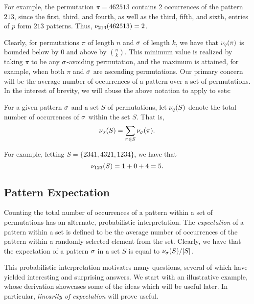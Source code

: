  For example, the permutation $\pi = 462513$ contains $2$ occurrences of the
  pattern $213$, since the first, third, and fourth, as well as the third,
  fifth, and sixth, entries of $p$ form $213$ patterns. Thus,
  $\nu_{213}(462513) = 2$.  

  Clearly, for permutations $\pi$ of length $n$ and $\sigma$ of length $k$, we have
  that $\nu_q(\pi)$ is bounded below by $0$ and above by $\binom{n}{k}$. This
  minimum value is realized by taking $\pi$ to be any $\sigma$-avoiding
  permutation, and the maximum is attained, for example, when both $\pi$ and
  $\sigma$ are ascending permutations.  Our primary concern will be the average
  number of occurrences of a pattern over a set of permutations. In the interest
  of brevity, we will abuse the above notation to apply to sets:
  
  \begin{definition} \label{def:set-occurrence} For a given pattern $\sigma$ and a
  set $S$ of permutations, let $\nu_q(S)$ denote the total number of
  occurrences of $\sigma$ within the set $S$. That is, $$ \nu_\sigma(S) = \sum_{\pi
  \in S} \nu_\sigma(\pi).$$ \end{definition}
  
  For example, letting $S = \{2341, 4321, 1234\}$, we have that 
  $$ \nu_{123}(S) = 1 + 0 + 4 = 5.$$ 

  \subsection{Pattern Expectation}
      
    Counting the total number of occurrences of a pattern within a set of
    permutations has an alternate, probabilistic interpretation. The
    \emph{expectation}  of a pattern within a set is defined
    to be the average number of occurrences of the pattern within a randomly
    selected element from the set. Clearly, we have that the expectation of a
    pattern $\sigma$ in a set $S$ is equal to $\nu_\sigma(S) / |S|$. 
    
    This probabilistic interpretation motivates many questions, several of which
    have yielded interesting and surprising answers. We start with an
    illustrative example, whose derivation showcases some of the ideas which
    will be useful later. In particular, \emph{linearity of expectation}
     will prove useful. 
    
